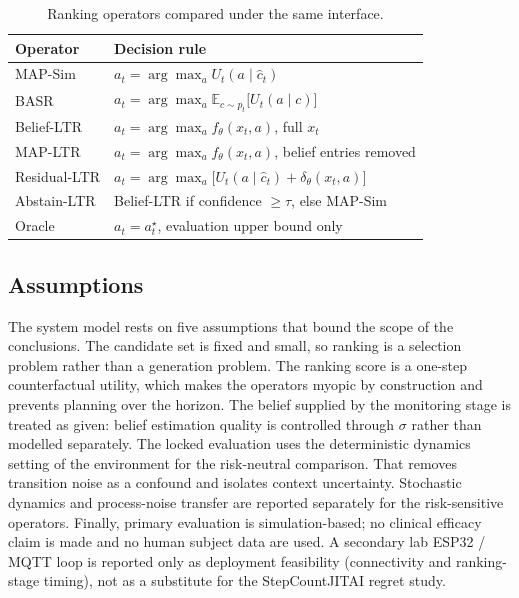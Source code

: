 \documentclass[journal]{IEEEtran}
\begin{document}
\begin{table}[t]
\centering
\caption{Ranking operators compared under the same interface.}
\label{tab:operators}
\footnotesize
\begin{tabular}{@{}lp{4.55cm}@{}}
\toprule
Operator & Decision rule \\
\midrule
MAP-Sim & \(a_t=\arg\max_a U_t(a\mid\hat{c}_t)\) \\
BASR & \(a_t=\arg\max_a \mathbb{E}_{c\sim p_t}\!\big[U_t(a\mid c)\big]\) \\
Belief-LTR & \(a_t=\arg\max_a f_\theta(x_t,a)\), full \(x_t\) \\
MAP-LTR & \(a_t=\arg\max_a f_\theta(x_t,a)\), belief entries removed \\
Residual-LTR & \(a_t=\arg\max_a \big[U_t(a\mid\hat{c}_t)+\delta_\theta(x_t,a)\big]\) \\
Abstain-LTR & Belief-LTR if confidence \(\ge\tau\), else MAP-Sim \\
Oracle & \(a_t=a_t^\star\), evaluation upper bound only \\
\bottomrule
\end{tabular}
\end{table}

\subsection{Assumptions}
\label{sec:assumptions}

The system model rests on five assumptions that bound the scope of the conclusions.
The candidate set is fixed and small, so ranking is a selection problem rather than a generation problem.
The ranking score is a one-step counterfactual utility, which makes the operators myopic by construction and prevents planning over the horizon.
The belief supplied by the monitoring stage is treated as given: belief estimation quality is controlled through \(\sigma\) rather than modelled separately.
The locked evaluation uses the deterministic dynamics setting of the environment for the risk-neutral comparison. That removes transition noise as a confound and isolates context uncertainty. Stochastic dynamics and process-noise transfer are reported separately for the risk-sensitive operators.
Finally, primary evaluation is simulation-based; no clinical efficacy claim is made and no human subject data are used.
A secondary lab ESP32 / MQTT loop is reported only as deployment feasibility (connectivity and ranking-stage timing), not as a substitute for the StepCountJITAI regret study.
\end{document}
